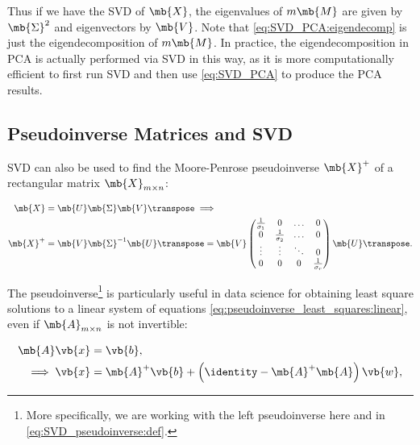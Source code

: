 Thus if we have the SVD of $\mb{X}$,
the eigenvalues of $m \mb{M}$ are given by $\mb{\Sigma}^{2}$ and eigenvectors by $\mb{V}$.
Note that \cref{eq:SVD_PCA:eigendecomp} is just the eigendecomposition of $m \mb{M}$.
In practice, the eigendecomposition in PCA is actually performed via SVD in this way,
as it is more computationally efficient to first
run SVD and then use \cref{eq:SVD_PCA} to produce the PCA results.

\subsection{Pseudoinverse Matrices and SVD}
\label{dim_reduct:SVD:pseudoinverse}

SVD can also be used to find the Moore-Penrose pseudoinverse \cite{moore1920,penrose1955} $\mb{X}^{+}$
of a rectangular matrix $\mb{X}_{m \times n}$:

\begin{subequations}\label{eq:SVD_pseudoinverse}
\begin{align}
\mb{X} &= \mb{U} \mb{\Sigma} \mb{V}\transpose \implies \label{eq:SVD_pseudoinverse:SVD} \\
\mb{X}^{+} &= \mb{V} \mb{\Sigma}^{-1} \mb{U}\transpose
= \mb{V}
\begin{pmatrix}
  \frac{1}{\sigma_{1}} & 0                    & \ldots & 0 \\
  0                    & \frac{1}{\sigma_{2}} & \ldots & 0 \\
  \vdots               & \vdots               & \ddots & 0 \\
  0                    & 0                    & 0      & \frac{1}{\sigma_{r}}
\end{pmatrix}
\mb{U}\transpose. \label{eq:SVD_pseudoinverse:def}
\end{align}
\end{subequations}

The pseudoinverse\footnote{More specifically, we are working with the left pseudoinverse here and in \cref{eq:SVD_pseudoinverse:def}.} is
particularly useful in data science
for obtaining least square solutions to a linear system of equations \cref{eq:pseudoinverse_least_squares:linear},
even if $\mb{A}_{m \times n}$ is not invertible:

\begin{subequations}\label{eq:pseudoinverse_least_squares}
\begin{align}
\mb{A} \vb{x} &= \vb{b}, \label{eq:pseudoinverse_least_squares:linear} \\
\implies \vb{x} &= \mb{A}^{+} \vb{b} + \left(\identity - \mb{A}^{+}\mb{A}\right) \vb{w}, \label{eq:pseudoinverse_least_squares:solution}
\end{align}
\end{subequations}


